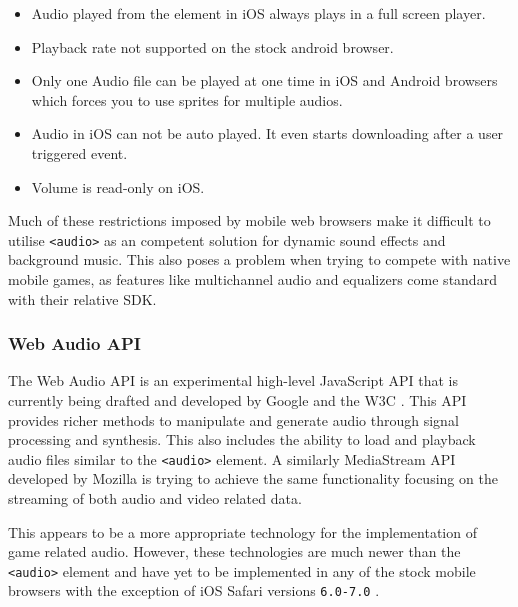 \documentclass[final]{cmpreport}
\begin{document}

\begin{itemize}
  \item Audio played from the element in iOS always plays in a full screen player.
  \item Playback rate not supported on the stock android browser.
  \item Only one Audio file can be played at one time in iOS and Android browsers which forces you to use sprites for multiple audios.
  \item Audio in iOS can not be auto played. It even starts downloading after a user triggered event.
  \item Volume is read-only on iOS.
\end{itemize}

Much of these restrictions imposed by mobile web browsers make it difficult to utilise \texttt{<audio>} as an competent solution for dynamic sound effects and background music. This also poses a problem when trying to compete with native mobile games, as features like multichannel audio and equalizers come standard with their relative SDK.

\subsubsection{Web Audio API}
The Web Audio API is an experimental high-level JavaScript API that is currently being drafted and developed by Google and the W3C \footnotemark. This API provides richer methods to manipulate and generate audio through signal processing and synthesis. This also includes the ability to load and playback audio files similar to the \texttt{<audio>} element. A similarly MediaStream API \footnotemark developed by Mozilla is trying to achieve the same functionality focusing on the streaming of both audio and video related data.


This appears to be a more appropriate technology for the implementation of game related audio. However, these technologies are much newer than the \texttt{<audio>} element and have yet to be implemented in any of the stock mobile browsers with the exception of iOS Safari versions \texttt{6.0-7.0} \footnotemark .
\end{document}
